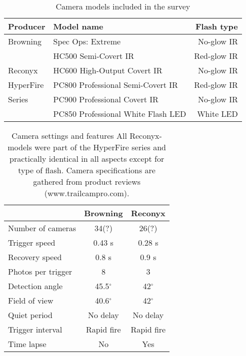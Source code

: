 

\begin{table}[h]
\caption{Camera models included in the survey}
\label{tab:cam_mod}
\centering

\begin{tabular}{llr}
\hline
Producer  & Model name & Flash type  \\
\hline 
Browning	& Spec Ops: Extreme 					& No-glow IR \\
			& HC500 Semi-Covert IR					& Red-glow IR \\
Reconyx		& HC600 High-Output Covert IR			& No-glow IR  \\
HyperFire 	& PC800 Professional Semi-Covert IR 	& Red-glow IR \\
Series 		& PC900 Professional Covert IR 			& No-glow IR  \\
    		& PC850 Professional White Flash LED	& White LED  \\
\hline
\end{tabular}
\end{table}


\begin{table}[h]
\caption[Camera settings and features]
{Camera settings and features %
All Reconyx-models were part of the HyperFire series and practically identical in all aspects except for type of flash. Camera specifications are gathered from product reviews (www.trailcampro.com).}
\label{tab:cam_set}
\centering
\begin{tabular}{lcc}
\hline 
 & Browning & Reconyx \\ 
\hline 
Number of cameras 	& 34(?) 	& 26(?) \\  
Trigger speed 		& 0.43 s 	& 0.28 s \\ 
Recovery speed 		& 0.8 s 	& 0.9 s \\ 
Photos per trigger 	& 8 		& 3 \\  
Detection angle 	& 45.5$^{\circ}$ 	& 42$^{\circ}$ \\ 
Field of view 		& 40.6$^{\circ}$ 	& 42$^{\circ}$ \\  
Quiet period 		& No delay 	& No delay \\ 
Trigger interval	& Rapid fire & Rapid fire \\
Time lapse			& No	 	& Yes \\
\hline 
\end{tabular} 
\end{table}





